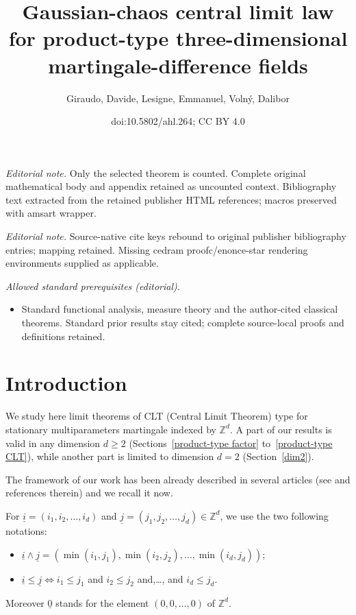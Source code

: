 \documentclass[10pt]{amsart}
\title{Gaussian-chaos central limit law for product-type three-dimensional martingale-difference fields}
\author{Giraudo, Davide, Lesigne, Emmanuel, Volný, Dalibor}
\date{doi:10.5802/ahl.264; CC BY 4.0}
\theoremstyle{definition}\newtheorem{defi}[theo]{Definition}\newtheorem{rema}[theo]{Remark}\newtheorem{exam}[theo]{Example}\newtheorem{exem}[theo]{Example}\newtheorem{nota}[theo]{Notation}
\newcommand{\Z}{\mathbb{Z}}
\begin{document}
\maketitle
\noindent\textit{Editorial note.} Only the selected theorem is counted. Complete original mathematical body and appendix retained as uncounted context. Bibliography text extracted from the retained publisher HTML references; macros preserved with amsart wrapper.\par\medskip
\noindent\textit{Editorial note.} Source-native cite keys rebound to original publisher bibliography entries; mapping retained. Missing cedram proofc/enonce-star rendering environments supplied as applicable.\par\medskip
\noindent\textit{Allowed standard prerequisites (editorial).}\begin{itemize}
\item Standard functional analysis, measure theory and the author-cited classical theorems. Standard prior results stay cited; complete source-local proofs and definitions retained.
\end{itemize}\medskip

\section{Introduction}\label{introduction}

We study here limit theorems of CLT (Central Limit Theorem) type for stationary multiparameters martingale indexed by $\Z^d$. {A part of our results is valid in any dimension $d\geq2$ (Sections~\ref{product-type factor} to~\ref{product-type CLT}), while another part is limited to dimension $d=2$ (Section~\ref{dim2}).}

The framework of our work has been already described in several articles (see \cite{MR3913270} and references therein) and we recall it now.

For $\underline{i}=(i_1,i_2,\dots,i_d)$ and $\underline{j}=(j_1,j_2,\dots,j_d)\in
\Z^d$, we use the two following notations:
\begin{itemize}
\item $\underline{i}\wedge\underline{j}=(\min(i_1,j_1),\min(i_2,j_2),\dots,
\min(i_d,j_d))$;
\item
$\underline{i}\leq\underline{j}\Leftrightarrow i_1\leq j_1$ and $i_2\leq j_2$ and,\dots, and $i_d\leq j_d$.
\end{itemize}
Moreover $\underline{0}$ stands for the element $(0,0,\dots,0)$ of $\Z^d$.
\end{document}
